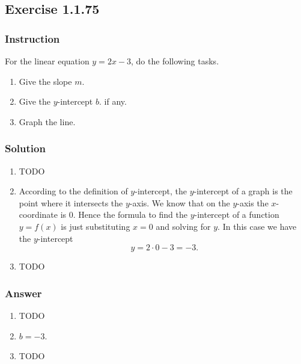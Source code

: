 \subsection*{Exercise 1.1.75}

\subsubsection*{Instruction}

For the linear equation $ y = 2x - 3 $, do the following tasks.

\begin{enumerate}[label = (\alph*)]
  \item
    Give the slope $ m $.
  \item
    Give the $ y $-intercept $ b $. if any.
  \item
    Graph the line.
\end{enumerate}

\subsubsection*{Solution}

\begin{enumerate}[label = (\alph*)]
  \item
    TODO
  \item
    According to the definition of $y$-intercept, the $y$-intercept of a graph is the point where it intersects the $y$-axis. We know that on the $y$-axis the $x$-coordinate is $0$. Hence the formula to find the $y$-intercept of a function $y = f(x)$ is just substituting $x = 0$ and solving for $y$. In this case we have the $y$-intercept
    \[\phantom{.} y = 2 \cdot 0 - 3 = -3 \text{.}\]
  \item
    TODO
\end{enumerate}

\subsubsection*{Answer}

\begin{enumerate}[label = (\alph*)]
  \item
    TODO
  \item
    $b = -3$.
  \item
    TODO
\end{enumerate}
